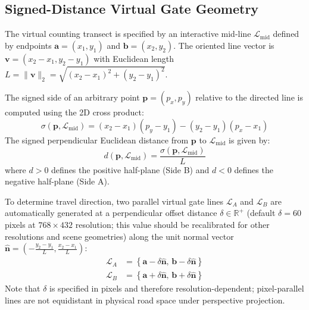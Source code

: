 \subsection{Signed-Distance Virtual Gate Geometry}
The virtual counting transect is specified by an interactive mid-line $\mathcal{L}_{\text{mid}}$ defined by endpoints $\mathbf{a} = (x_1, y_1)$ and $\mathbf{b} = (x_2, y_2)$. The oriented line vector is $\mathbf{v} = (x_2 - x_1, y_2 - y_1)$ with Euclidean length $L = \|\mathbf{v}\|_2 = \sqrt{(x_2-x_1)^2 + (y_2-y_1)^2}$.

The signed side of an arbitrary point $\mathbf{p} = (p_x, p_y)$ relative to the directed line is computed using the 2D cross product:
\begin{equation}
    \sigma(\mathbf{p}, \mathcal{L}_{\text{mid}}) = (x_2 - x_1)(p_y - y_1) - (y_2 - y_1)(p_x - x_1)
    \label{eq:cross_product}
\end{equation}
The signed perpendicular Euclidean distance from $\mathbf{p}$ to $\mathcal{L}_{\text{mid}}$ is given by:
\begin{equation}
    d(\mathbf{p}, \mathcal{L}_{\text{mid}}) = \frac{\sigma(\mathbf{p}, \mathcal{L}_{\text{mid}})}{L}
\end{equation}
where $d > 0$ defines the positive half-plane (Side B) and $d < 0$ defines the negative half-plane (Side A).

To determine travel direction, two parallel virtual gate lines $\mathcal{L}_A$ and $\mathcal{L}_B$ are automatically generated at a perpendicular offset distance $\delta \in \mathbb{R}^+$ (default $\delta = 60$ pixels at $768 \times 432$ resolution; this value should be recalibrated for other resolutions and scene geometries) along the unit normal vector $\hat{\mathbf{n}} = (-\frac{y_2-y_1}{L}, \frac{x_2-x_1}{L})$:
\begin{align}
    \mathcal{L}_A &= \left\{ \mathbf{a} - \delta \hat{\mathbf{n}}, \, \mathbf{b} - \delta \hat{\mathbf{n}} \right\} \\
    \mathcal{L}_B &= \left\{ \mathbf{a} + \delta \hat{\mathbf{n}}, \, \mathbf{b} + \delta \hat{\mathbf{n}} \right\}
\end{align}
Note that $\delta$ is specified in pixels and therefore resolution-dependent; pixel-parallel lines are not equidistant in physical road space under perspective projection.

